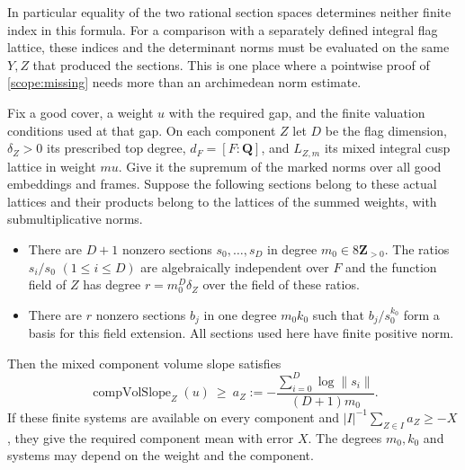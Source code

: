 In particular equality of the two rational section spaces determines
neither finite index in this formula. For a comparison with a
separately defined integral flag lattice, these indices and the
determinant norms must be evaluated on the same \(Y,Z\) that
produced the sections. This is one place where a pointwise proof
of \eqref{scope:missing} needs more than an archimedean norm estimate.

\begin{proposition}\label{zetageo:mean}
Fix a good cover, a weight \(u\) with the required gap, and the
finite valuation conditions used at that gap. On each component
\(Z\) let \(D\) be the flag dimension, \(\delta_Z>0\) its prescribed
top degree, \(d_F=[F:\mathbf Q]\), and \(L_{Z,m}\) its mixed integral
cusp lattice in weight \(mu\). Give it the supremum of the marked
norms over all good embeddings and frames.
Suppose the following sections belong to these actual lattices and
their products belong to the lattices of the summed weights, with
submultiplicative norms.
\begin{itemize}
\item There are \(D+1\) nonzero sections \(s_0,\ldots,s_D\) in
degree \(m_0\in8\mathbf Z_{>0}\). The ratios \(s_i/s_0\)
\((1\le i\le D)\) are algebraically independent over \(F\) and
the function field of \(Z\) has degree \(r=m_0^D\delta_Z\) over
the field of these ratios.
\item There are \(r\) nonzero sections \(b_j\) in one degree
\(m_0 k_0\) such that \(b_j/s_0^{k_0}\) form a basis for this field
extension. All sections used here have finite positive norm.
\end{itemize}
Then the mixed component volume slope satisfies
\[
 \operatorname{compVolSlope}_Z(u)\ \ge\
 a_Z:=-\frac{\sum_{i=0}^D\log\|s_i\|}{(D+1)m_0}.
\]
If these finite systems are available on every component and
\(|I|^{-1}\sum_{Z\in I}a_Z\ge-X\), they give the required component
mean with error \(X\). The degrees \(m_0,k_0\) and systems may
depend on the weight and the component.
\end{proposition}

